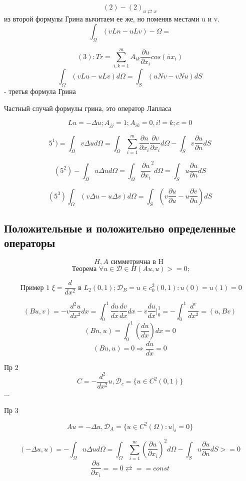 \documentclass[12pt, a4paper]{article}
\begin{document}
\[ (2) - (2)_{u \rightleftarrows x} \]
из второй формулы Грина вычитаем ее же, но поменяв местами u и v.
\[ \int_{\Omega}^{} (vLn - u Lv) - \Omega =\]

\[ (3): Tr = \sum_{i,k=1}^{m } A_{ik } \frac{\partial u }{\partial x_i } cos(\overline{u} x_i) \]
\[ \int_{\Omega }^{} (vLu - uLv) d\Omega = \int_{S }^{} (u N v- vN u) dS \] - третья формула Грина

Частный случай формулы грина, это оператор Лапласа

\[ Lu = - \Delta u; A_{jj} = 1; A_{ik} = 0, i != k; c= 0 \]

\[ 5^1) = \int_{\Omega }^{} v \Delta u d\Omega  = \int_{\Omega}^{} \sum_{i=1}^{m } \frac{\partial n }{\partial x_i }  \frac{\partial v }{\partial x_i} d \Omega - \int_{S }^{} v \frac{\partial u }{\partial n } dS \]

\[ (5^2) - \int_{\Omega}^{} u \Delta u d \Omega = \int_{\Omega}^{} \frac{\partial u }{\partial x_i }^2 d \Omega= \int_{S }^{} u \frac{\partial u }{\partial n } dS  \]

\[ (5^3) \int_{\Omega}^{} (v \Delta u - u \Delta v ) d\Omega = \int_{S }^{} (v \frac{\partial u }{\partial u }- u \frac{\partial v}{\partial u}) dS \]

\subsection{Положительные и положительно определенные операторы}

\[ H, A \textrm{  симметрична в H } \]
\[ \textrm{ Теорема } \forall u \in \mathcal{D } \in H (Au, u) >= 0; \]

\[ \textrm{ Пример 1 } \xi = \frac{ d }{d x^2 } \textrm{ в  }L_2 (0,1); \mathcal{D }_B = {u \in c^2_0 (0,1): u(0) = u(1) = 0} \]

\[ (B u, v) = - v  \frac{d^2 u }{d x^2} dx = \int_{0}^{1} \frac{du }{dx} \frac{d v }{d x } dx - v \frac{d u }{dx }|^1_0 = - \int_{0}^{1} \frac{d^ v }{dx^2 } = (u, Bv) \]
\[ (Bn, u) = \int_{0}^{1} (\frac{du }{dx }) dx = 0 \]
\[ (Bu, u) = 0 \Rightarrow \frac{du }{dx } = 0 \]

Пр 2
\[ C = - \frac{ d^2 }{dx^2 }u, \mathcal{D}_c = \{ u \in C^2(0,1) \} \]
...


Пр 3

\[ Au = - \Delta u , \mathcal{D}_A = \{ u \in C^2(\Omega): u|_s = 0 \} \]

\[ (-\Delta u, u ) = - \int_{\Omega }^{} u \Delta u d \Omega = \int_{\Omega }^{} \sum_{i = 1}^{m } (\frac{\partial u }{\partial x_i })^2 d\Omega - \int_{S }^{} u \frac{\partial u }{\partial n } dS >= 0 \]
\[ \frac{\partial u }{\partial x_i } == 0 \rightleftarrows == const \]
\end{document}
